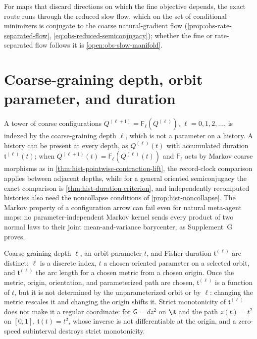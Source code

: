 For maps that discard directions on which the fine objective depends, the exact route
runs through the reduced slow flow, which on the set of conditional minimizers is
conjugate to the coarse natural-gradient flow (\cref{prop:obs-rate-separated-flow},
\eqref{eq:obs-reduced-semiconjugacy}); whether the fine or rate-separated flow follows
it is \cref{open:obs-slow-manifold}.

\section{Coarse-graining depth, orbit parameter, and duration}
\label{sec:hist-rg-depth-not-time}

A tower of coarse configurations $Q^{(\ell+1)}=\mathsf F_\ell(Q^{(\ell)})$,
$\ell=0,1,2,\ldots$, is indexed by the coarse-graining depth $\ell$, which is not a
parameter on a history.  A history can be present at every depth, as $Q^{(\ell)}(t)$
with accumulated duration $\mathfrak t^{(\ell)}(t)$; when
$Q^{(\ell+1)}(t)=\mathsf F_\ell(Q^{(\ell)}(t))$ and $\mathsf F_\ell$ acts by Markov coarse
morphisms as in \cref{thm:hist-pointwise-contraction-lift}, the record-clock comparison
applies between adjacent depths, while for a general oriented semiconjugacy the exact
comparison is \cref{thm:hist-duration-criterion}, and independently recomputed
histories also need the noncollapse conditions of \cref{prop:hist-noncollapse}.  The
Markov property of a configuration arrow can fail even for natural meta-agent maps:
no parameter-independent Markov kernel sends every product of two normal laws to
their joint mean-and-variance barycenter, as Supplement~G proves.

Coarse-graining depth $\ell$, an orbit parameter $t$, and Fisher duration
$\mathfrak t^{(\ell)}$ are distinct: $\ell$ is a discrete index, $t$ a chosen oriented
parameter on a selected orbit, and $\mathfrak t^{(\ell)}$ the arc length for a chosen
metric from a chosen origin.  Once the metric, origin, orientation, and parameterized path
are chosen, $\mathfrak t^{(\ell)}$ is a function of $t$, but it is not determined by the
unparameterized orbit or by $\ell$: changing the metric rescales it and changing the
origin shifts it.  Strict monotonicity of $\mathfrak t^{(\ell)}$ does not make it a
regular coordinate: for $\mathsf G=dz^2$ on $\R$ and the path $z(t)=t^2$ on $[0,1]$,
$\mathfrak t(t)=t^2$, whose inverse is not differentiable at the origin, and a zero-speed
subinterval destroys strict monotonicity.  

